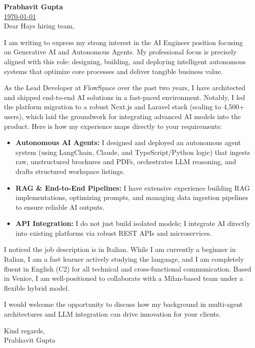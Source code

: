 \documentclass[11pt,a4paper]{article}
\begin{document}
{\Large \textbf{Prabhavit Gupta}} \\[1ex]
  \href{mailto:prabhavitg@gmail.com \\[2ex]
\noindent\rule{\textwidth}{0.4pt} \\[2ex]{prabhavitg@gmail.com} | +39 351 610 7807 |  \urlstyle{same}\href{https://www.linkedin.com/in/prabhavit/}{LinkedIn}
}


\today \\[2ex]
Dear Hays hiring team,


I am writing to express my strong interest in the AI Engineer position focusing on Generative AI and Autonomous Agents. My professional focus is precisely aligned with this role: designing, building, and deploying intelligent autonomous systems that optimize core processes and deliver tangible business value.


As the Lead Developer at FlowSpace over the past two years, I have architected and shipped end-to-end AI solutions in a fast-paced environment. Notably, I led the platform migration to a robust Next.js and Laravel stack (scaling to 4,500+ users), which laid the groundwork for integrating advanced AI models into the product. Here is how my experience maps directly to your requirements:


\begin{itemize}
    \item \textbf{Autonomous AI Agents:} I designed and deployed an autonomous agent system (using LangChain, Claude, and TypeScript/Python logic) that ingests raw, unstructured brochures and PDFs, orchestrates LLM reasoning, and drafts structured workspace listings.
    \item \textbf{RAG \& End-to-End Pipelines:} I have extensive experience building RAG implementations, optimizing prompts, and managing data ingestion pipelines to ensure reliable AI outputs.
    \item \textbf{API Integration:} I do not just build isolated models; I integrate AI directly into existing platforms via robust REST APIs and microservices.
\end{itemize}
\vspace{6pt}

I noticed the job description is in Italian. While I am currently a beginner in Italian, I am a fast learner actively studying the language, and I am completely fluent in English (C2) for all technical and cross-functional communication. Based in Venice, I am well-positioned to collaborate with a Milan-based team under a flexible hybrid model.


I would welcome the opportunity to discuss how my background in multi-agent architectures and LLM integration can drive innovation for your clients.


\begin{flushright}
Kind regards, \\[3ex]

Prabhavit Gupta
\end{flushright}
\end{document}
